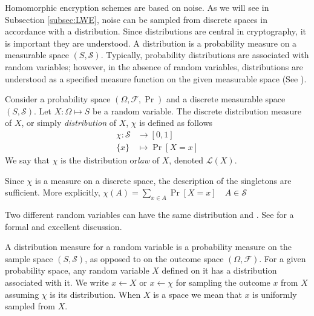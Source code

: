 Homomorphic encryption schemes are based on noise. As we will see in Subsection \ref{subsec:LWE}, noise can be sampled from discrete spaces in accordance with a distribution. Since distributions are central in cryptography, it is important they are understood. A distribution is a probability measure on a measurable space $(S, \mathcal{S})$. Typically, probability distributions are associated with random variables; however, in the absence of random variables, distributions are understood as a specified measure function on the given measurable space (See \cite[pp. 83]{kallenberg-probability}).
\begin{definition}
Consider a probability space $(\Omega, \mathcal{F}, \operatorname{Pr})$ and a discrete measurable space $(S,\mathcal{S})$. Let $X \colon \Omega \mapsto S$ be a random variable. The discrete distribution measure of $X$, or simply \textit{distribution} of $X$, $\chi$ is defined as follows
\begin{equation*}
\begin{aligned}
    \chi \colon \mathcal{S} &\to [0,1]\\
    \{x\} &\mapsto \operatorname{Pr}[X = x]
\end{aligned}
\end{equation*}
We say that $\chi$ is the distribution or\textit{law} of $X$, denoted $\mathcal{L}(X)$. 
\end{definition}
\begin{remark}
    Since $\chi$ is a measure on a discrete space, the description of the singletons are sufficient. More explicitly, $\chi(A) = \sum_{x \in A} \operatorname{Pr}[X = x] \quad A \in \mathcal{S}$
\end{remark}
\begin{remark}
     Two different random variables can have the same distribution and . See \cite{cont-finance} for a formal and excellent discussion.
\end{remark}
A distribution measure for a random variable is a probability measure on the sample space $(S,\mathcal{S})$, as opposed to on the outcome space $(\Omega, \mathcal{F})$. For a given probability space, any random variable $X$ defined on it has a distribution associated with it. We write $x \leftarrow X$ or $x \leftarrow \chi$ for sampling the outcome $x$ from $X$ assuming $\chi$ is its distribution. When $X$ is a space we mean that $x$ is uniformly sampled from $X$.

